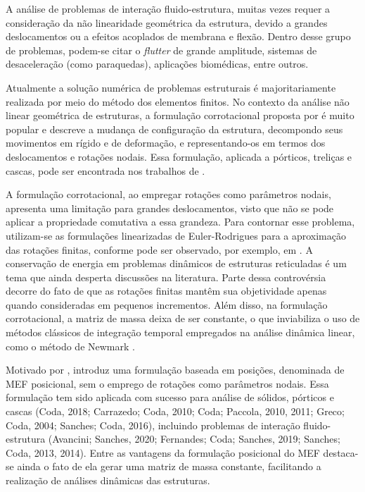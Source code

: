 A análise de problemas de interação fluido-estrutura, muitas vezes requer a consideração da não linearidade geométrica da estrutura, devido a grandes deslocamentos ou a efeitos acoplados de membrana e flexão. Dentro desse grupo de problemas, podem-se citar o \textit{flutter} de grande amplitude, sistemas de desaceleração (como paraquedas), aplicações biomédicas, entre outros.

Atualmente a solução numérica de problemas estruturais é majoritariamente realizada por meio do método dos elementos finitos. No contexto da análise não linear geométrica de estruturas, a formulação corrotacional proposta por  é muito popular e descreve a mudança de configuração da estrutura, decompondo seus movimentos em rígido e de deformação, e representando-os em termos dos deslocamentos e rotações nodais. Essa formulação, aplicada a pórticos, treliças e cascas, pode ser encontrada nos trabalhos de .

A formulação corrotacional, ao empregar rotações como parâmetros nodais, apresenta uma limitação para grandes deslocamentos, visto que não se pode aplicar a propriedade comutativa a essa grandeza. Para contornar esse problema, utilizam-se as formulações linearizadas de Euler-Rodrigues para a aproximação das rotações finitas, conforme pode ser observado, por exemplo, em . A conservação de energia em problemas dinâmicos de estruturas reticuladas é um tema que ainda desperta discussões na literatura. Parte dessa controvérsia decorre do fato de que as rotações finitas mantêm sua objetividade apenas quando consideradas em pequenos incrementos. Além disso, na formulação corrotacional, a matriz de massa deixa de ser constante, o que inviabiliza o uso de métodos clássicos de integração temporal empregados na análise dinâmica linear, como o método de Newmark  \cite{SanchesC:2013}.

Motivado por ,  introduz uma formulação baseada em posições, denominada de MEF posicional, sem o emprego de rotações como parâmetros nodais. Essa formulação tem sido aplicada com sucesso para análise de sólidos, pórticos e cascas (Coda, 2018; Carrazedo;
Coda, 2010; Coda; Paccola, 2010, 2011; Greco; Coda, 2004; Sanches;
Coda, 2016), incluindo problemas de interação fluido-estrutura (Avancini; Sanches, 2020;
Fernandes; Coda; Sanches, 2019; Sanches; Coda, 2013, 2014). Entre as vantagens da formulação posicional do MEF destaca-se ainda o fato de ela gerar uma matriz de massa constante, facilitando a realização de análises dinâmicas das estruturas.

